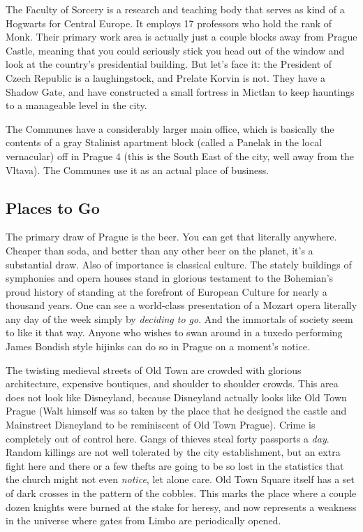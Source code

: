 The Faculty of Sorcery is a research and teaching body that serves as kind of a Hogwarts for Central Europe. It employs 17 professors who hold the rank of Monk. Their primary work area is actually just a couple blocks away from Prague Castle, meaning that you could seriously stick you head out of the window and look at the country's presidential building. But let's face it: the President of Czech Republic is a laughingstock, and Prelate Korvin is not. They have a Shadow Gate, and have constructed a small fortress in Mictlan to keep hauntings to a manageable level in the city.

The Communes have a considerably larger main office, which is basically the contents of a gray Stalinist apartment block (called a Panelak in the local vernacular) off in Prague 4 (this is the South East of the city, well away from the Vltava). The Communes use it as an actual place of business.

\subsection{Places to Go}

\hspace{\parindent} The primary draw of Prague is the beer. You can get that literally anywhere. Cheaper than soda, and better than any other beer on the planet, it's a substantial draw. Also of importance is classical culture. The stately buildings of symphonies and opera houses stand in glorious testament to the Bohemian's proud history of standing at the forefront of European Culture for nearly a thousand years. One can see a world-class presentation of a Mozart opera literally any day of the week simply by \textit{deciding to go}. And the immortals of society seem to like it that way. Anyone who wishes to swan around in a tuxedo performing James Bondish style hijinks can do so in Prague on a moment's notice.

The twisting medieval streets of Old Town are crowded with glorious architecture, expensive boutiques, and shoulder to shoulder crowds. This area does not look like Disneyland, because Disneyland actually looks like Old Town Prague (Walt himself was so taken by the place that he designed the castle and Mainstreet Disneyland to be reminiscent of Old Town Prague). Crime is completely out of control here. Gangs of thieves steal forty passports a \textit{day}. Random killings are not well tolerated by the city establishment, but an extra fight here and there or a few thefts are going to be so lost in the statistics that the church might not even \textit{notice}, let alone care. Old Town Square itself has a set of dark crosses in the pattern of the cobbles. This marks the place where a couple dozen knights were burned at the stake for heresy, and now represents a weakness in the universe where gates from Limbo are periodically opened.

